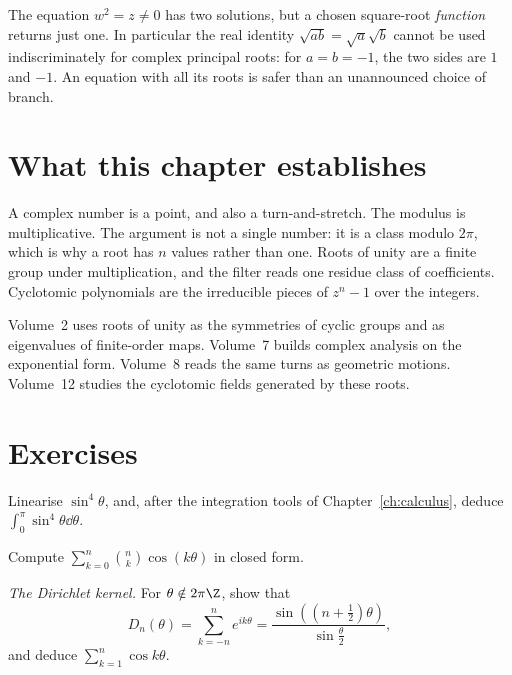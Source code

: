 \begin{reminder}
The equation $w^2=z\ne0$ has two solutions, but a chosen square-root \emph{function} returns just one. In particular the real identity $\sqrt{ab}=\sqrt a\sqrt b$ cannot be used indiscriminately for complex principal roots: for $a=b=-1$, the two sides are $1$ and $-1$. An equation with all its roots is safer than an unannounced choice of branch.
\end{reminder}

\section*{What this chapter establishes}
A complex number is a point, and also a turn-and-stretch. The modulus is multiplicative. The argument is not a single number: it is a class modulo $2\pi$, which is why a root has $n$ values rather than one. Roots of unity are a finite group under multiplication, and the filter reads one residue class of coefficients. Cyclotomic polynomials are the irreducible pieces of $z^n-1$ over the integers.

Volume~2 uses roots of unity as the symmetries of cyclic groups and as eigenvalues of finite-order maps. Volume~7 builds complex analysis on the exponential form. Volume~8 reads the same turns as geometric motions. Volume~12 studies the cyclotomic fields generated by these roots.

\section{Exercises}

\begin{exercise}[$\star$]\label{ex:lin}
Linearise $\sin^4\theta$, and, after the integration tools of Chapter~\ref{ch:calculus}, deduce $\displaystyle\int_0^{\pi}\sin^4\theta\dd\theta$.
\end{exercise}

\begin{exercise}[$\star$]\label{ex:binomcos}
Compute $\displaystyle\sum_{k=0}^n\binom nk\cos(k\theta)$ in closed form.
\end{exercise}

\begin{exercise}[$\star\star$]\label{ex:dirichlet}
\emph{The Dirichlet kernel.} For $\theta\notin2\pi\Z$, show that
\[
D_n(\theta)=\sum_{k=-n}^ne^{ik\theta}=\frac{\sin\left((n+\frac12)\theta\right)}{\sin\frac\theta2},
\]
and deduce $\displaystyle\sum_{k=1}^n\cos k\theta$.
\end{exercise}

